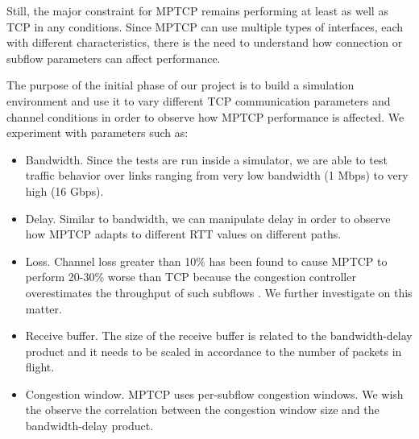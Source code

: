 Still, the major constraint for MPTCP remains performing at least as well as TCP in any conditions. Since MPTCP can use multiple types of interfaces, each with different characteristics, there is the need to understand how connection or subflow parameters can affect performance.

The purpose of the initial phase of our project is to build a simulation environment and use it to vary different TCP communication parameters and channel conditions in order to observe how MPTCP performance is affected. We experiment with parameters such as:
\begin{itemize}
\item Bandwidth. Since the tests are run inside a simulator, we are able to test traffic behavior over links ranging from very low bandwidth (1 Mbps) to very high (16 Gbps).
\item Delay. Similar to bandwidth, we can manipulate delay in order to observe how MPTCP adapts to different RTT values on different paths.
\item Loss. Channel loss greater than 10\% has been found to cause MPTCP to perform 20-30\% worse than TCP because the congestion controller overestimates the throughput of such subflows \cite{TODO}. We further investigate on this matter.
\item Receive buffer. The size of the receive buffer is related to the bandwidth-delay product and it needs to be scaled in accordance to the number of packets in flight.
\item Congestion window. MPTCP uses per-subflow congestion windows. We wish the observe the correlation between the congestion window size and the bandwidth-delay product.
\end{itemize}
